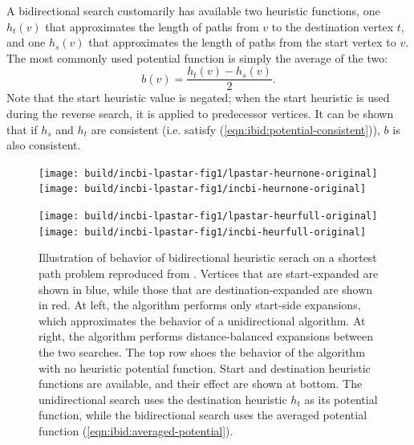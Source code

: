 A bidirectional search customarily has available
two heuristic functions,
one $h_t(v)$ that approximates the length of paths
from $v$ to the destination vertex $t$,
and one $h_s(v)$ that approximates the length of paths
from the start vertex to $v$.
The most commonly used potential function
\citep{ikeda1994betterroutes, goldberg2005spexternalmemory}
is simply the average of the two:
\begin{equation}
   b(v) = \frac{h_t(v) - h_s(v)}{2}.
   \label{eqn:ibid:averaged-potential}
\end{equation}
Note that the start heuristic value is negated;
when the start heuristic is used during the reverse search,
it is applied to predecessor vertices.
It can be shown that if $h_s$ and $h_t$ are consistent
(i.e. satisfy (\ref{eqn:ibid:potential-consistent})),
$b$ is also consistent.

\begin{figure}
   \centering%
   
   \texttt{[image: build/incbi-lpastar-fig1/lpastar-heurnone-original]}%
   \;\;%
   \texttt{[image: build/incbi-lpastar-fig1/incbi-heurnone-original]}%
   
   
   \vspace{0.2cm}
   
   \texttt{[image: build/incbi-lpastar-fig1/lpastar-heurfull-original]}%
   \;\;%
   \texttt{[image: build/incbi-lpastar-fig1/incbi-heurfull-original]}%
   
   \caption{Illustration of behavior of bidirectional heuristic serach
      on a shortest path problem reproduced
      from \citep{koenig2004lpastar}.
      Vertices that are start-expanded are shown in blue,
      while those that are destination-expanded are shown in red.
      At left, the algorithm performs only start-side expansions,
      which approximates the behavior of a unidirectional algorithm.
      At right, the algorithm  performs distance-balanced expansions
      between the two searches.
      The top row shoes the behavior of the algorithm with no
      heuristic potential function.
      Start and destination heuristic functions are available,
      and their effect are shown at bottom.
      The unidirectional search uses the destination heuristic $h_t$
      as its potential function,
      while the bidirectional search uses the averaged potential
      function (\ref{eqn:ibid:averaged-potential}).
      }
   \label{fig:incbi-lpastar-fig1-heurchange}
\end{figure}

